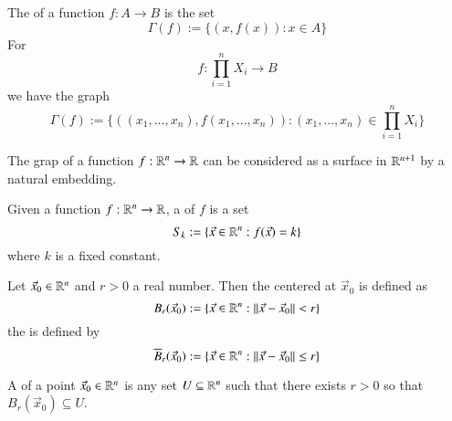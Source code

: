 \begin{appendices}
    
    \begin{defn}
        The  of a function $f:A\rightarrow B$ is the set \begin{equation}
            \Gamma(f):=\{(x,f(x)):x \in A\}
        \end{equation}
        For \begin{equation}
            f:\prod\limits_{i=1}^nX_i\rightarrow B
        \end{equation}
        we have the graph \begin{equation}
            \Gamma(f):= \{((x_1,...,x_n),f(x_1,...,x_n)):(x_1,...,x_n) \in \prod\limits_{i=1}^nX_i\}
        \end{equation}
    \end{defn}

    \begin{rmk}
        The grap of a function $f:\mathbb R^n\rightarrow \mathbb R$ can be considered as a surface in $\mathbb R^{n+1}$ by a natural embedding.
    \end{rmk}


    \begin{defn}
        Given a function $f:\mathbb R^n\rightarrow \mathbb R$, a  of $f$ is a set \begin{equation}
            S_k := \{\vec{x} \in \mathbb R^n: f(\vec{x}) = k\}
        \end{equation}
        where $k$ is a fixed constant.
    \end{defn}


    \begin{defn}
        Let $\vec{x}_0 \in \mathbb R^n$ and $r > 0$ a real number. Then the  centered at $\vec{x}_0$ is defined as \begin{equation}
            B_r(\vec{x}_0) := \{\vec{x} \in \mathbb R^n: ||\vec{x} - \vec{x}_0|| < r\}
        \end{equation}
        the  is defined by \begin{equation}
            \overline{B}_r(\vec{x}_0) := \{\vec{x} \in \mathbb R^n: ||\vec{x} - \vec{x}_0|| \leq r\}
        \end{equation}
    \end{defn}

    \begin{defn}
        A  of a point $\vec{x}_0 \in \mathbb R^n$ is any set $U \subseteq \mathbb R^n$ such that there exists $r > 0$ so that $B_r(\vec{x}_0) \subseteq U$.
    \end{defn}



\end{appendices}
